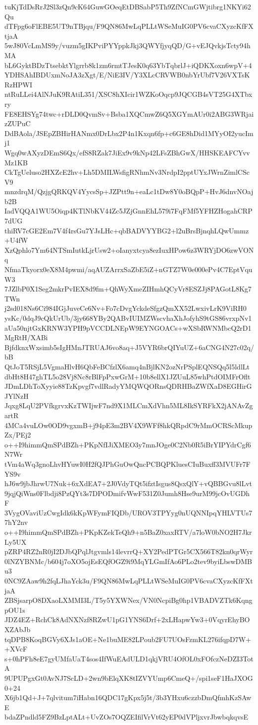 tuKjTdDsRrJ2Sl3zQn9cK64GuwGOeqEtDBSabP5Th9ZfNCmGWjtibrg1NKYi62Qu
dTFpg6oFlEBE5UT9nTBjqu/F9QN86MwLqPLLtWSeMuIG0PV6cvaCXyzcKfFXtjaA
5wJ80VcLmMS9y/vuzm5gIKPviPYYppkJkj3QWYfjyqQD/G+vEJQvkjsTcty94hMA
bL6GyktBDzTtsebktYlgrrb8k1zm6rmtTJesK0q63YbTqbrlJ+iQDKXoxn6wpV+4
YDHSAhIBDUxmNoJA3zXgt/E/NiE3IV/Y3XLcCRVWB0nbYrUbf7V26VXTsKRzHPWI
ntRuLLei4AlNJuK9RAtiL351/XSC8hXIcir1WZKoOqcp9JQCGB4sVT25G4XTbxry
FE8EHSYg74twc+rDLD0QvmSv+Bsba1XQCmwZ6Q5XGYmAUr0i2ABG3WRjaizZUPuC
DdBAola/JSEpZBHirHANmx0DrLbx2P4n1Kxqn6fp+c6GE8hDid1MYyOI2yucImj1
Wgq0wAXyzDEmS6Qx/efS8RZak7JiEx9v9kNp42LFsZBhGwX/HHSKEAFCYvvMz1KB
CkTgUeluso2HXZcE2hv+Lh5DMILWsfigRNhmNv3NrdpI2pptUYxJWrnZimlCScV9
mnzdrqM/QzjgQRKQV4YycsSp+JZPtt9n+eaLc1tDw8Y0oBQpP+HvJ6dnvNOajb2B
IadVQQA1WU5Oiqp4KTlNbKV44Zc5JZjGnnEhL579i7FqFMf5YFHZHogahCRP7dUG
thiRV7cGE2Em7V4f4rsGu7YJsLHc+qbBADVYYBG2+l2uBrsBjnqhLQwUmmz+U4fW
XzQphlo7Ym64NTSmIutkLjrUsw2+oIanyxtcya8ezIuxHPow6z3WRYjDO6zwVONq
NfmaTkyorx0eX8M4pwmi/aqAUZArrxSaZbE5iZ+nGTZ7W0e000ePv4C7EptVquW3
7JZlbP0X1Seg2mkrPvIEX8d9fm+QhWyXmeZIHmhQCyVr8ESZJj8PAGotL8Kg7TWn
j2sd018Ns6Ci984IGjJuveCe6Nv+Fo7cDvgYckdeSfgzQmXX52LwxivLrK9ViRH0
ysKc/0dqJ9cQkUrUb/3jy668YBy2QABvIUIMZWscvhaXhJofyhS9tGS86vrxpNv1
aUa50njtGxKRNW3YPH9pVCCDLNEpW9EYNGOACs+wXSbRWNMbcQ2rD1MgRtH/XABi
BjfdknxWxsimb5sIgHMnJTRUAJ6vo8aq+J5VYR6brQIYuUZ+6aCNG4N27c02q/bB
QtJoT5RSjL5VgmaHlvH6QbFeBCfzlX6amq4nBjlKN2ozNrPSplEQNSQq5l5ldlLt
dbHt8H47ghTL5o28Vj8Nc8rBlFpPxwGrM+10b8ellX1JZUuL85whPtdOIMFrOflt
JDmLDhToXyyie88TzKpvgf7vdlRadyYMQWQORnsQDRHBaZWfXaD8EGHirGJYlNzH
Jqxg8LqU2PVfkgrvxKzTWIjwF7nd9X1MLCmXdVhn5ML8IkSYRFkX2jANAvZgartR
4MCa4vuLOw0OD9vgxmB+j94pE3m2BV4X9WFf8hkQRpdC9rMmOCRScMkupZx/PEj2
o++I9himmQmSPdBZh+PKpNfIJiXMEO3y7mnJOge0C2Nb0R5iBrYIPYdrCgf6N7Wr
tVm4aWq3gnoLhvHYuwI0H2fQJPhGuOwQncPCBQPKluesCIuBuxff3MVUFr7FYS9v
hJ6w9jbJhrwU7Nuk+6xXdEA7+2J0VdyTQt5ifztIsgus8QsxQlY+vQBBGvu8lLvt
9jqjQiWns0Flbdji8PzQYt3s7DPODmifvWwF531Z0Jumh8Hse9urM99jcOvUGDhF
3VygOVaviUzCwgIdk6kKpWFymFIQDb/UROV3TPYyg0nUQNNIpqYHLVTUs77hY2nv
o++I9himmQmSPdBZh+PKpKZekTeQh9+n5BaZ0xaxRTV/a7loW0bNO2H7JkrLy5UX
pZRP4RZ2nR0jI2DJbQPqlJtgvmls14levrrQ+XY2PedPTGr5CX566T82kn0qrWyr
0lNZYBNMc/b604j7oXO5ojEsEQfOGZ9i9MqYLGmIfAo6PLo2tev9byiLbswDMBu3
0NC9ZAaw9h2fqLJhaYck3u/F9QN86MwLqPLLtWSeMuIG0PV6cvaCXyzcKfFXtjaA
ZBSjsarpO8DXaoLXMMI3L/T5y5YXWNex/VN0NcpiBg0hp1VBADVZTk6KqngpOU1s
JDZ4EZ+RchCk8AdNXNzf8RZwU1pG1YNS6Drf+2xLHapwYw3+0VqyrEhyBOXZAbJb
tqDPB8KoqBGVy6XJs1aOE+Ne1buME82LPoub2FU7UOsFzmKL276ifqpD7W++XVcF
s+0hPFh8eE7gyUMfaUaT4sos4IfWuEAdULD1qkjVRU4OfOL0xFOfczNeDZI3TotA
9UPUPgxGt0AvNJ7ScLD+2wn9bElqXK8tIZVYUmp6CmeQ+/spi1seF1HaJXOG0+24
X6jb1Qd+J+7qlvitum7iHabn16QDC17gKpx5j5t/3b3YHxu6czzbDmQfmhKzSAwE
bdaZPndld5FZ9BzLptALt+UvZOs7OQZEIfilVrVt62yEP0dVPljxvrJbwbqkqvsE
